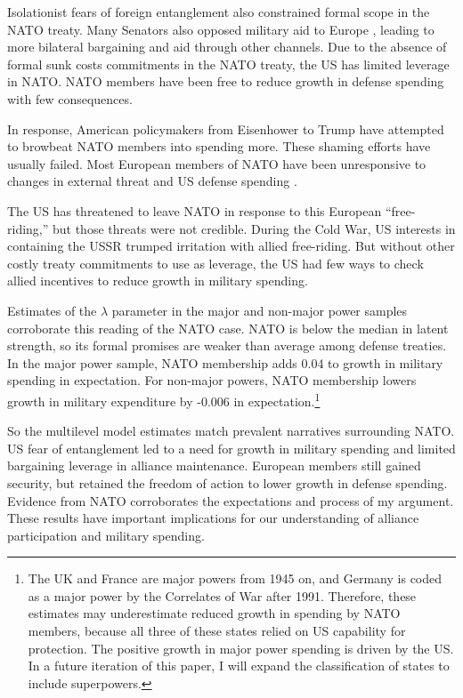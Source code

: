 \documentclass[12pt]{article}
\begin{document}
Isolationist fears of foreign entanglement also constrained formal scope in the NATO treaty. 
Many Senators also opposed military aid to Europe \citep[pg 285]{Acheson1969}, leading to more bilateral bargaining and aid through other channels. 
Due to the absence of formal sunk costs commitments in the NATO treaty, the US has limited leverage in NATO. 
NATO members have been free to reduce growth in defense spending with few consequences. 


In response, American policymakers from Eisenhower to Trump have attempted to browbeat NATO members into spending more. 
These shaming efforts have usually failed. 
Most European members of NATO have been unresponsive to changes in external threat and US defense spending \citep{PluemperNeumayer2015}. 


The US has threatened to leave NATO in response to this European ``free-riding,'' but those threats were not credible. 
During the Cold War, US interests in containing the USSR trumped irritation with allied free-riding.  
But without other costly treaty commitments to use as leverage, the US had few ways to check allied incentives to reduce growth in military spending. 


Estimates of the $\lambda$ parameter in the major and non-major power samples corroborate this reading of the NATO case. 
NATO is below the median in latent strength, so its formal promises are weaker than average among defense treaties. 
In the major power sample, NATO membership adds 0.04 to growth in military spending in expectation.
For non-major powers, NATO membership lowers growth in military expenditure by -0.006 in expectation.\footnote{
The UK and France are major powers from 1945 on, and Germany is coded as a major power by the Correlates of War after 1991. Therefore, these estimates may underestimate reduced growth in spending by NATO members, because all three of these states relied on US capability for protection. The positive growth in major power spending is driven by the US. In a future iteration of this paper, I will expand the classification of states to include superpowers.}


So the multilevel model estimates match prevalent narratives surrounding NATO.
US fear of entanglement led to a need for growth in military spending and limited bargaining leverage in alliance maintenance. 
European members still gained security, but retained the freedom of action to lower growth in defense spending.   
Evidence from NATO corroborates the expectations and process of my argument. 
These results have important implications for our understanding of alliance participation and military spending. 
\end{document}
